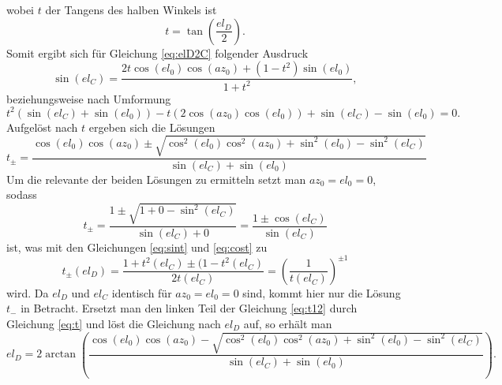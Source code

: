 wobei $t$ der Tangens des halben Winkels ist
\begin{equation}
t=\tan\left(\frac{el_D}{2}\right).
\label{eq:t}
\end{equation}
Somit ergibt sich für Gleichung \ref{eq:elD2C} folgender Ausdruck
\begin{equation}
\sin\left(el_C\right)=\frac{2t\cos\left(el_0\right)\cos\left(az_0\right)+\left(1-t^2\right)\sin\left(el_0 \right)}{1+t^2},
\end{equation}
beziehungsweise nach Umformung
\begin{equation}
t^2\left(\sin(el_C)+\sin(el_0)\right)-t\left(2\cos(az_0)\cos(el_0)\right)+\sin(el_C)-\sin(el_0)=0.
\end{equation}
Aufgelöst nach $t$ ergeben sich die Lösungen
\begin{equation}
t_{\pm}=\frac{\cos\left(el_0\right)\cos\left(az_0\right)\pm\sqrt{\cos^2\left(el_0\right)\cos^2\left(az_0\right)+\sin^2\left(el_0\right)-\sin^2\left(el_C\right)}}{\sin\left(el_C\right)+\sin\left(el_0\right)}
\label{eq:t12}
\end{equation}
Um die relevante der beiden Lösungen zu ermitteln setzt man $az_0=el_0=0$, sodass
\begin{equation}
t_{\pm}=\frac{1\pm\sqrt{1+0-\sin^2\left(el_C\right)}}{\sin\left(el_C\right)+0}=\frac{1\pm\cos\left(el_C\right)}{\sin\left(el_C\right)}
\end{equation}
ist, was mit den Gleichungen \ref{eq:sint} und \ref{eq:cost} zu 
\begin{equation}
t_{\pm}(el_D)=\frac{1+t^2(el_C)\pm(1-t^2(el_C)}{2t(el_C)}=\left(\frac{1}{t(el_C)}\right)^{\pm1}
\end{equation}
wird. Da $el_D$ und $el_C$ identisch für $az_0=el_0=0$ sind, kommt hier nur die Lösung $t_-$ in Betracht. Ersetzt man den linken Teil der Gleichung \ref{eq:t12} durch Gleichung \ref{eq:t} und löst die Gleichung nach $el_D$ auf, so erhält man
\begin{equation}
el_D=2\arctan\left(\frac{\cos(el_0)\cos(az_0)-\sqrt{\cos^2(el_0)\cos^2(az_0)+\sin^2(el_0)-\sin^2(el_C)}}{\sin(el_C)+\sin(el_0)}\right).
\label{eq:elC2D}
\end{equation}
